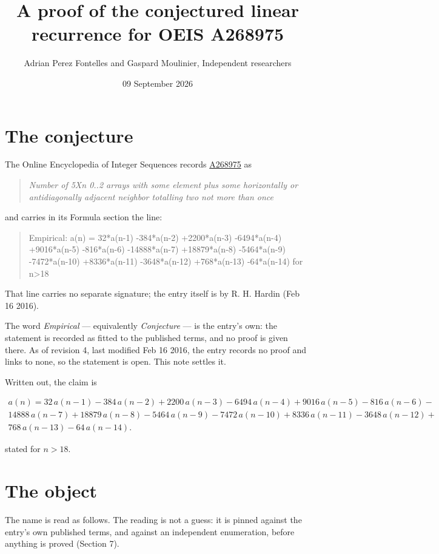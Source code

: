 \documentclass[11pt]{article}
\title{A proof of the conjectured linear recurrence for OEIS A268975}
\author{Adrian Perez Fontelles and Gaspard Moulinier, Independent researchers}
\date{09 September 2026}
\theoremstyle{definition}
\begin{document}
\maketitle
\section{The conjecture}

The Online Encyclopedia of Integer Sequences records \href{https://oeis.org/A268975}{A268975} as

\begin{quote}\itshape Number of 5Xn 0..2 arrays with some element plus some horizontally or antidiagonally adjacent neighbor totalling two not more than once\end{quote}

and carries in its Formula section the line:

\begin{quote}\ttfamily Empirical: a(n) = 32*a(n-1) -384*a(n-2) +2200*a(n-3) -6494*a(n-4) +9016*a(n-5) -816*a(n-6) -14888*a(n-7) +18879*a(n-8) -5464*a(n-9) -7472*a(n-10) +8336*a(n-11) -3648*a(n-12) +768*a(n-13) -64*a(n-14) for n>18\end{quote}

That line carries no separate signature; the entry itself is by R. H. Hardin (Feb 16 2016).

The word {\itshape Empirical} --- equivalently {\itshape Conjecture} --- is the entry's own: the statement is recorded as fitted to the published terms, and no proof is given there. As of revision 4, last modified Feb 16 2016, the entry records no proof and links to none, so the statement is open. This note settles it.

Written out, the claim is

\begin{multline*} a(n) = 32\,a(n-1) - 384\,a(n-2) + 2200\,a(n-3) - 6494\,a(n-4) + 9016\,a(n-5) - 816\,a(n-6) - \\ 14888\,a(n-7) + 18879\,a(n-8) - 5464\,a(n-9) - 7472\,a(n-10) + 8336\,a(n-11) - 3648\,a(n-12) + \\ 768\,a(n-13) - 64\,a(n-14). \end{multline*}

stated for $n > 18$.

\section{The object}

The name is read as follows. The reading is not a guess: it is pinned against the entry's own published terms, and against an independent enumeration, before anything is proved (Section 7).
\end{document}
